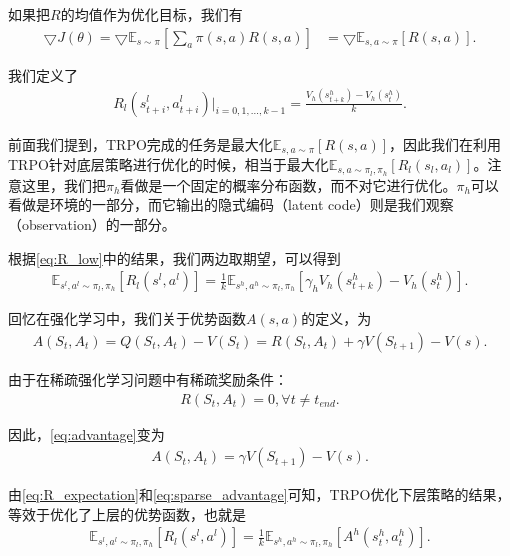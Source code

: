 如果把$R$的均值作为优化目标，我们有
\begin{align}
  \bigtriangledown J(\theta) = \bigtriangledown \mathbb{E}_{s\sim\pi}[\sum_{a} \pi(s, a) R(s, a)]
  &= \bigtriangledown \mathbb{E}_{s, a\sim\pi}[R(s, a)].
  \label{eq:policy_gradient}
\end{align}

我们定义了
\begin{align}
  R_l(s_{t + i}^l, a_{t + i}^l)|_{i = 0,1,...,k-1} = \frac{V_h(s_{t + k}^h) - V_h(s_{t}^h)}{k}.
  \label{eq:R_low}
\end{align}

前面我们提到，TRPO完成的任务是最大化$\mathbb{E}_{s, a \sim \pi}[R(s, a)]$，因此我们在利用TRPO针对底层策略进行优化的时候，相当于最大化$\mathbb{E}_{s, a \sim \pi_l, \pi_h}[R_l(s_l, a_l)]$。注意这里，我们把$\pi_h$看做是一个固定的概率分布函数，而不对它进行优化。$\pi_h$可以看做是环境的一部分，而它输出的隐式编码（latent code）则是我们观察（observation）的一部分。

根据\eqref{eq:R_low}中的结果，我们两边取期望，可以得到
\begin{align}
  \mathbb{E}_{s^l, a^l \sim \pi_l, \pi_h}[R_l(s^l, a^l)] = \frac{1}{k} \mathbb{E}_{s^h, a^h \sim \pi_l, \pi_h}[\gamma_h V_h(s_{t + k}^h) - V_h(s_{t}^h)].
  \label{eq:R_expectation}
\end{align}

回忆在强化学习中，我们关于优势函数$A(s, a)$的定义，为
\begin{align}
  A(S_t, A_t) = Q(S_t, A_t) - V(S_t) = R(S_t, A_t) + \gamma V(S_{t + 1}) - V(s).
  \label{eq:advantage}
\end{align}

由于在稀疏强化学习问题中有稀疏奖励条件：
\begin{align}
  R(S_t, A_t) = 0, \forall t \neq t_{end}.
  \label{eq:sparse_reward_condition}
\end{align}

因此，\eqref{eq:advantage}变为
\begin{align}
  A(S_t, A_t) = \gamma V(S_{t + 1}) - V(s).
  \label{eq:sparse_advantage}
\end{align}

由\eqref{eq:R_expectation}和\eqref{eq:sparse_advantage}可知，TRPO优化下层策略的结果，等效于优化了上层的优势函数，也就是
\begin{align}
  \mathbb{E}_{s^l, a^l \sim \pi_l, \pi_h}[R_l(s^l, a^l)] = \frac{1}{k} \mathbb{E}_{s^h, a^h \sim \pi_l, \pi_h}[A^h(s_t^h, a_t^h)].
  \label{eq:R_expectation_is_advantage}
\end{align}

